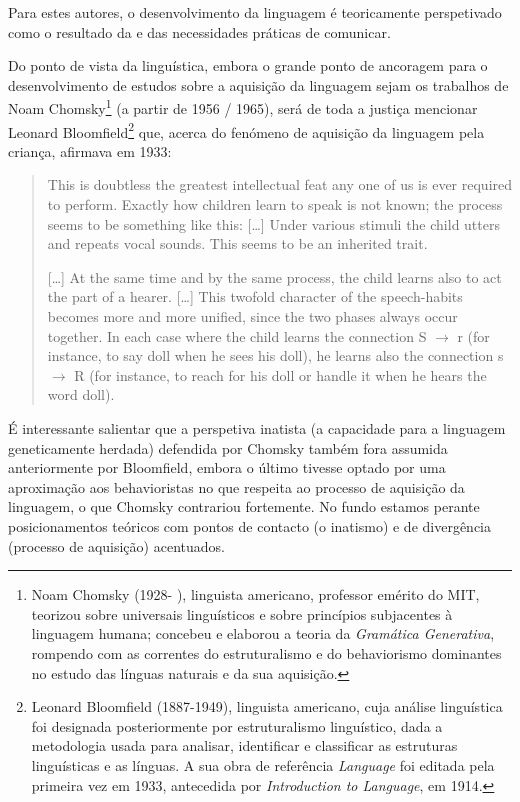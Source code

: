 \documentclass[output=paper]{LSP/langsci}
\begin{document}
Para estes autores, o desenvolvimento da linguagem é teoricamente perspetivado como o resultado da  e das necessidades práticas de comunicar.

Do ponto de vista da linguística, embora o grande ponto de ancoragem para o desenvolvimento de estudos sobre a aquisição da linguagem sejam os trabalhos de Noam Chomsky\footnote{Noam Chomsky (1928- ), linguista americano, professor emérito do MIT, teorizou sobre universais linguísticos e sobre princípios subjacentes à linguagem humana; concebeu e elaborou a teoria da \textit{Gramática Generativa}, rompendo com as correntes do estruturalismo e do behaviorismo dominantes no estudo das línguas naturais e da sua aquisição.} (a partir de 1956 / 1965), será de toda a justiça mencionar Leonard Bloomfield\footnote{Leonard Bloomfield (1887-1949), linguista americano, cuja análise linguística foi designada posteriormente por estruturalismo linguístico, dada a metodologia usada para analisar, identificar e classificar as estruturas linguísticas e as línguas. A sua obra de referência \emph{Language} foi editada pela primeira vez em 1933, antecedida por \emph{Introduction to Language}, em 1914.} que, acerca do fenómeno de aquisição da linguagem pela criança, afirmava em 1933:

\begin{quote}
This is doubtless the greatest intellectual feat any one of us is ever required to perform. Exactly how children learn to speak is not known; the process seems to be something like this: [\ldots] Under various stimuli the child utters and repeats vocal sounds. This seems to be an inherited trait.

[\ldots] At the same time and by the same process, the child learns also to act the part of a hearer. [\ldots] This twofold character of the speech-habits becomes more and more unified, since the two phases always occur together. In each case where the child learns the connection S $\rightarrow$ r (for instance, to say doll when he sees his doll), he learns also the connection s $\rightarrow$ R (for instance, to reach for his doll or handle it when he hears the word doll). \citep[29--31]{bloomfield1933}
\end{quote}

É interessante salientar que a perspetiva inatista (a capacidade para a linguagem geneticamente herdada) defendida por Chomsky também fora assumida anteriormente por Bloomfield, embora o último tivesse optado por uma aproximação aos behavioristas no que respeita ao processo de aquisição da linguagem, o que Chomsky contrariou fortemente. No fundo estamos perante posicionamentos teóricos com pontos de contacto (o inatismo) e de divergência (processo de aquisição) acentuados. 
\end{document}
